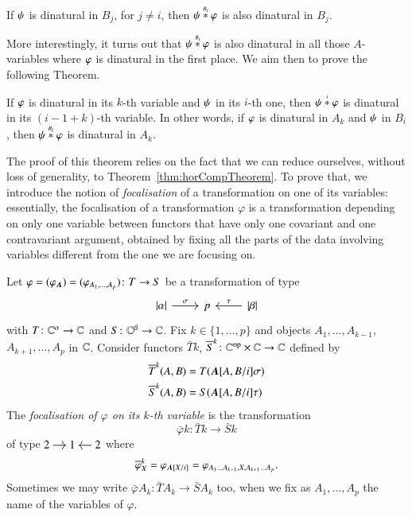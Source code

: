 \begin{proposition}
    If $\psi$ is dinatural in $B_j$, for $j \ne i$, then $\HC \fst \snd {B_i}$ is also dinatural in $B_j$.
\end{proposition}

More interestingly, it turns out that $\HC \fst \snd {B_i}$ is also dinatural in all those $A$-variables where $\fst$ is dinatural in the first place. We aim then to prove the following Theorem.

\begin{theorem}\label{thm:horCompIsDinat}
    If $\fst$ is dinatural in its $k$-th variable and $\psi$ in its $i$-th one, then $\HC \fst \snd i$ is dinatural in its $(i-1+k)$-th variable. In other words, if $\fst$ is dinatural in $A_k$ and $\psi$ in $B_i$, then $\HC \fst \snd {B_i}$ is dinatural in $A_k$.
\end{theorem}

The proof of this theorem relies on the fact that we can reduce ourselves, without loss of generality, to Theorem~\ref{thm:horCompTheorem}. To prove that, we introduce the notion of \emph{focalisation} of a transformation on one of its variables: essentially, the focalisation of a transformation $\varphi$ is a transformation depending on only one variable between functors that have only one covariant and one contravariant argument, obtained by fixing all the parts of the data involving variables different from the one we are focusing on.

\begin{definition}\label{def:focalisation def}
    Let $\varphi = (\varphi_\bfA) = (\varphi_{A_1,\dots,A_p}) \colon T \to S$ be a transformation of type 
    \[
    \begin{tikzcd}
    \length\alpha \ar[r,"\sigma"] & p & \ar[l,"\tau"'] \length\beta
    \end{tikzcd}
    \]
    with $T \colon \mathbb C^\alpha \to \mathbb C$ and $S \colon \mathbb C^\beta \to \mathbb C$. Fix $k\in\{1,\dots,p\}$ and objects $A_1,\dots,A_{k-1}$, $A_{k+1},\dots,A_p$ in $\mathbb C$. Consider functors $\bar T k$, $\bar S k \colon \Op\C \times \C \to \C$ defined by
    \begin{align*}
    \bar T k (A,B) &= T(\substMV \bfA A B i \sigma) \\
    \bar S k (A,B) &= S(\substMV \bfA A B i \tau)
    \end{align*}
    The \emph{focalisation of $\varphi$ on its $k$-th variable} is the transformation 
    \[
    \bar \varphi k \colon \bar T k \to \bar S k
    \]
    of type 
    $
    \begin{tikzcd}[cramped, sep=small]
    2 \ar[r] & 1 & \ar[l] 2
    \end{tikzcd}
    $
    where 
    \[
    \bar \varphi k_X = \phi_{\subst \bfA X i} = \varphi_{A_1\dots A_{k-1},X,A_{k+1}\dots A_p}.
    \] 
    Sometimes we may write $\bar \varphi {A_k} \colon \bar T {A_k} \to \bar S {A_k}$ too, when we fix as $A_1,\dots,A_p$ the name of the variables of $\varphi$.
\end{definition}

